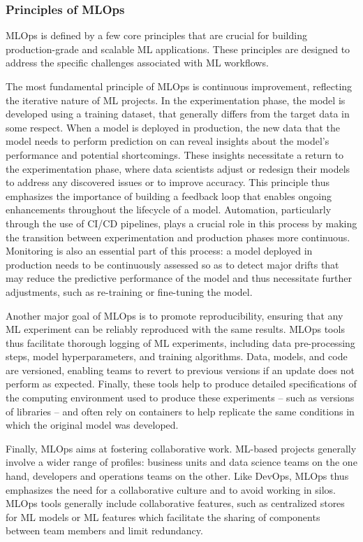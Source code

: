 \documentclass[graybox]{svmult}
\begin{document}
\subsubsection{Principles of MLOps}
\label{sec:principles-mlops}

MLOps is defined by a few core principles that are crucial for building production-grade and scalable ML applications. These principles are designed to address the specific challenges associated with ML workflows.

The most fundamental principle of MLOps is continuous improvement, reflecting the iterative nature of ML projects. In the experimentation phase, the model is developed using a training dataset, that generally differs from the target data in some respect. When a model is deployed in production, the new data that the model needs to perform prediction on can reveal insights about the model's performance and potential shortcomings. These insights necessitate a return to the experimentation phase, where data scientists adjust or redesign their models to address any discovered issues or to improve accuracy. This principle thus emphasizes the importance of building a feedback loop that enables ongoing enhancements throughout the lifecycle of a model. Automation, particularly through the use of CI/CD pipelines, plays a crucial role in this process by making the transition between experimentation and production phases more continuous. Monitoring is also an essential part of this process: a model deployed in production needs to be continuously assessed so as to detect major drifts that may reduce the predictive performance of the model and thus necessitate further adjustments, such as re-training or fine-tuning the model.

Another major goal of MLOps is to promote reproducibility, ensuring that any ML experiment can be reliably reproduced with the same results. MLOps tools thus facilitate thorough logging of ML experiments, including data pre-processing steps, model hyperparameters, and training algorithms. Data, models, and code are versioned, enabling teams to revert to previous versions if an update does not perform as expected. Finally, these tools help to produce detailed specifications of the computing environment used to produce these experiments -- such as versions of libraries -- and often rely on containers to help replicate the same conditions in which the original model was developed.

Finally, MLOps aims at fostering collaborative work. ML-based projects generally involve a wider range of profiles: business units and data science teams on the one hand, developers and operations teams on the other. Like DevOps, MLOps thus emphasizes the need for a collaborative culture and to avoid working in silos. MLOps tools generally include collaborative features, such as centralized stores for ML models or ML features which facilitate the sharing of components between team members and limit redundancy.
\end{document}
